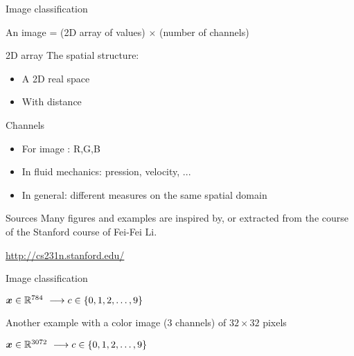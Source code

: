 \begin{frame}{Image classification}
  \begin{center}
    An image = (2D array of values) $\times$ (number of channels)
  \end{center}
  \begin{block}{2D array}
    The spatial structure:
    \begin{itemize}
    \item A 2D real space
    \item With distance 
    \end{itemize}
  \end{block}
  \begin{block}{Channels}
    \begin{itemize}
    \item For image : R,G,B
    \item In fluid mechanics: pression, velocity, ... 
    \item In general: different measures on the same spatial domain
    \end{itemize}
  \end{block}
  \begin{block}{Sources}
    Many figures and examples are inspired by, or extracted from the
    course of the Stanford course of Fei-Fei Li.
    \begin{flushright}
      \small \url{http://cs231n.stanford.edu/}
    \end{flushright}
  \end{block}
\end{frame}

\begin{frame}{Image classification}
  \begin{center}
    $\boldsymbol{x} \in \mathbb{R}^{784} \ \longrightarrow {c}  \in\{0, 1,2, \ldots ,9
    \}$
  \end{center}
  Another example with a color image (3 channels) of $32\times32$ pixels
  \begin{center}
    $\boldsymbol{x} \in \mathbb{R}^{3072} \ \longrightarrow {c}  \in\{0, 1,2, \ldots ,9
    \}$
  \end{center}
\end{frame}


